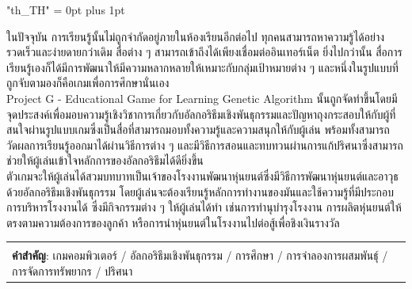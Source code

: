 \documentclass[12pt,oneside,openright,a4paper]{cpe-english-project}
\begin{document}
{
\XeTeXlinebreaklocale "th_TH"	
\XeTeXlinebreakskip = 0pt plus 1pt
\thaifont
\thaiabstract

ในปัจจุบัน การเรียนรู้นั้นไม่ถูกจำกัดอยู่ภายในห้องเรียนอีกต่อไป ทุกคนสามารถหาความรู้ได้อย่างรวดเร็วและง่ายดายกว่าเดิม สื่อต่าง ๆ สามารถเข้าถึงได้เพียงเชื่อมต่ออินเทอร์เน็ต ยิ่งไปกว่านั้น สื่อการเรียนรู้เองก็ได้มีการพัฒนาให้มีความหลากหลายให้เหมาะกับกลุ่มเป้าหมายต่าง ๆ และหนึ่งในรูปแบบที่ถูกจับตามองก็คือเกมเพื่อการศึกษานั่นเอง \\
Project G - Educational Game for Learning Genetic Algorithm นั้นถูกจัดทำขึ้นโดยมีจุดประสงค์เพื่อมอบความรู้เชิงวิชาการเกี่ยวกับอัลกอริธึมเชิงพันธุกรรมและปัญหาถุงกระสอบให้กับผู้ที่สนใจผ่านรูปแบบเกมซึ่งเป็นสื่อที่สามารถมอบทั้งความรู้และความสนุกให้กับผู้เล่น พร้อมทั้งสามารถวัดผลการเรียนรู้ออกมาได้ผ่านวิธีการต่าง ๆ และมีวิธีการสอนและทบทวนผ่านการแก้ปริศนาซึ่งสามารถช่วยให้ผู้เล่นเข้าใจหลักการของอัลกอริธึมได้ดียิ่งขึ้น \\
ตัวเกมจะให้ผู้เล่นได้สวมบทบาทเป็นเจ้าของโรงงานพัฒนาหุ่นยนต์ซึ่งมีวิธีการพัฒนาหุ่นยนต์และอาวุธด้วยอัลกอริธึมเชิงพันธุกรรม โดยผู้เล่นจะต้องเรียนรู้หลักการทำงานของมันและใช้ความรู้ที่มีประกอบการบริหารโรงงานได้ ซึ่งมีกิจกรรมต่าง ๆ ให้ผู้เล่นได้ทำ เช่นการทำนุบำรุงโรงงาน การผลิตหุ่นยนต์ให้ตรงตามความต้องการของลูกค้า หรือการนำหุ่นยนต์ในโรงงานไปต่อสู้เพื่อชิงเงินรางวัล


\begin{flushleft}
\begin{tabular*}{\textwidth}{@{}lp{}}
 & \\

\textbf{คำสำคัญ}: เกมคอมพิวเตอร์ / อัลกอริธึมเชิงพันธุกรรม / การศึกษา / การจำลองการผสมพันธุ์ / การจัดการทรัพยากร / ปริศนา
\end{tabular*}
\end{flushleft}
\endabstract
}

\preface
\end{document}
